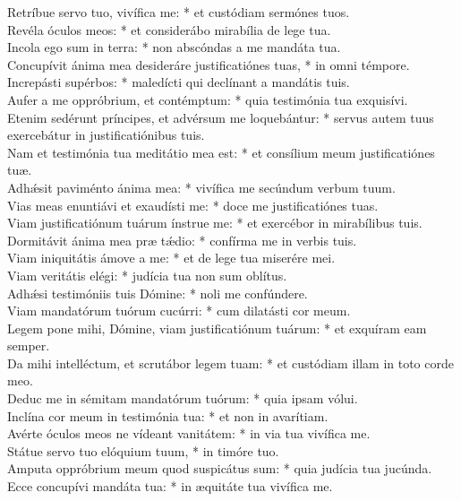 {	Retríbue servo tuo, vivífica me: * et custódiam sermónes tuos. \\
	Revéla óculos meos: * et considerábo mirabília de lege tua. \\
	Incola ego sum in terra: * non abscóndas a me mandáta tua. \\
	Concupívit ánima mea desideráre justificatiónes tuas, * in omni témpore. \\
	Increpásti supérbos: * maledícti qui declínant a mandátis tuis. \\
	Aufer a me oppróbrium, et contémptum: * quia testimónia tua exquisívi. \\
	Etenim sedérunt príncipes, et advérsum me loquebántur: * servus autem tuus exercebátur in justificatiónibus tuis. \\
	Nam et testimónia tua meditátio mea est: * et consílium meum justificatiónes tuæ. \\
	Adhǽsit paviménto ánima mea: * vivífica me secúndum verbum tuum. \\
	Vias meas enuntiávi et exaudísti me: * doce me justificatiónes tuas. \\
	Viam justificatiónum tuárum ínstrue me: * et exercébor in mirabílibus tuis. \\
	Dormitávit ánima mea præ tǽdio: * confírma me in verbis tuis. \\
	Viam iniquitátis ámove a me: * et de lege tua miserére mei. \\
	Viam veritátis elégi: * judícia tua non sum oblítus. \\
	Adhǽsi testimóniis tuis Dómine: * noli me confúndere. \\
	Viam mandatórum tuórum cucúrri: * cum dilatásti cor meum. \\
	Legem pone mihi, Dómine, viam justificatiónum tuárum: * et exquíram eam semper. \\
	Da mihi intelléctum, et scrutábor legem tuam: * et custódiam illam in toto corde meo. \\
	Deduc me in sémitam mandatórum tuórum: * quia ipsam vólui. \\
	Inclína cor meum in testimónia tua: * et non in avarítiam. \\
	Avérte óculos meos ne vídeant vanitátem: * in via tua vivífica me. \\
	Státue servo tuo elóquium tuum, * in timóre tuo. \\
	Amputa oppróbrium meum quod suspicátus sum: * quia judícia tua jucúnda. \\
	Ecce concupívi mandáta tua: * in æquitáte tua vivífica me. \\
}
